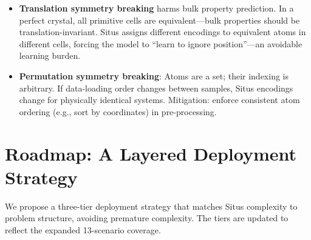 \documentclass[12pt,a4paper]{article}
\begin{document}
\begin{itemize}[nosep]
\item \textbf{Translation symmetry breaking} harms bulk property prediction. In a perfect crystal, all primitive cells are equivalent—bulk properties should be translation-invariant. Situs assigns different encodings to equivalent atoms in different cells, forcing the model to ``learn to ignore position''—an avoidable learning burden.
\item \textbf{Permutation symmetry breaking}: Atoms are a set; their indexing is arbitrary. If data-loading order changes between samples, Situs encodings change for physically identical systems. Mitigation: enforce consistent atom ordering (e.g., sort by coordinates) in pre-processing.
\end{itemize}

\section{Roadmap: A Layered Deployment Strategy}
\label{sec:roadmap}

We propose a three-tier deployment strategy that matches Situs complexity to problem structure, avoiding premature complexity. The tiers are updated to reflect the expanded 13-scenario coverage.
\end{document}
